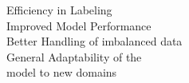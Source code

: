 \documentclass[preview]{standalone}
\begin{document}
Efficiency in Labeling\\Improved Model Performance\\Better Handling of imbalanced data\\General Adaptability of the \\model to new domains\\
\end{document}
